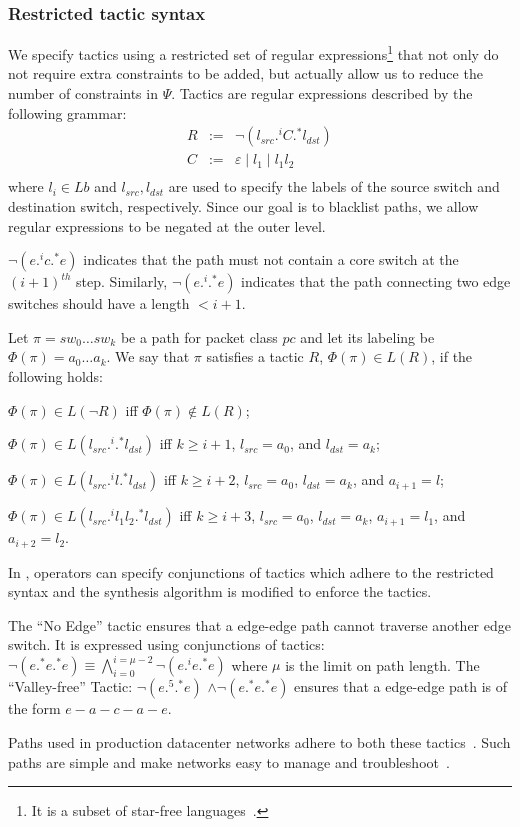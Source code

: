 \subsubsection{Restricted tactic syntax} 
We specify tactics using a restricted set of regular expressions\footnote{
	It is a subset of star-free languages~\cite{starfree}.}
 that not only do not require extra constraints to be added,
but actually allow us to reduce the number of constraints in $\Psi$.
Tactics are regular expressions described by the following grammar:
$$\begin{array}{rcl}
R  &  :=  &  \neg (l_{src} .^i C .^* l_{dst}) \\
C  &  :=  &  \varepsilon \mid l_1 \mid l_1 l_2\\
\end{array}$$
where $l_i\in Lb$ and $l_{src}, l_{dst}$ are used to specify the labels of the source switch 
and destination switch, respectively.
Since our goal is to blacklist paths, we allow regular expressions to be negated at the outer level. 
\begin{example}
 $\neg (e .^i c .^* e)$ indicates that the path must not contain a core switch at the $(i+1)^{th}$ step. 
 Similarly, $\neg (e .^i .^* e)$ indicates that the path connecting two edge switches should have a length $ < i + 1$. 
\end{example}

Let $\pi = sw_0\ldots sw_k$ be a path for packet class $pc$
and let its labeling be $\Phi(\pi)= a_0\ldots a_k$.
We say that $\pi$ satisfies a tactic $R$,  $\Phi(\pi) \in L(R)$, if the following
holds:
\begin{compact2itemize}
\item $\Phi(\pi) \in L(\neg R)$ iff $\Phi(\pi) \not\in L(R)$;
\item $\Phi(\pi) \in L( l_{src} .^i .^* l_{dst})$ iff $k\geq i+1$, $l_{src}= a_0$, and $l_{dst}= a_k$; 
\item $\Phi(\pi)  \in L (l_{src} .^i l.^* l_{dst})$ iff $k\geq i+2$, $l_{src}= a_0$, $l_{dst}= a_k$, and $a_{i+1}=l$;
\item $\Phi(\pi)  \in L( l_{src} .^i l_1 l_2.^* l_{dst})$ iff $k\geq i+3$, $l_{src}= a_0$, $l_{dst}= a_k$, $a_{i+1}=l_1$, and $a_{i+2}=l_2$.
\end{compact2itemize}
In \Name, operators can specify conjunctions of tactics which adhere to the restricted 
syntax and the synthesis algorithm is modified to enforce the tactics. 
\begin{example}
The ``No Edge'' tactic ensures that a edge-edge path
cannot traverse another edge switch. It is expressed using conjunctions of tactics:
$\neg (e .^* e .^* e)\equiv \bigwedge \limits_{i=0}^{i=\mu-2} \neg (e .^i e .^* e)$ where $\mu$ is the limit on path length. 
The ``Valley-free'' Tactic:  $\neg (e .^5 .^* e)$ $\wedge \neg (e .^* e .^* e)$  
ensures that a edge-edge path is of the form $e-a-c-a-e$. 
\end{example}
Paths used in production datacenter networks adhere to both these
tactics~\cite{vl2-sigcomm09,jupiterrising-sigcomm15}. Such paths are
simple and make networks easy to manage and
troubleshoot~\cite{benson:complexity:nsdi2009}.

